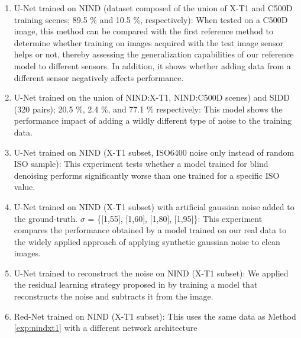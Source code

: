 \documentclass[10pt,twocolumn,letterpaper]{article}
\makeatletter
\newcommand\footnoteref[1]{\protected@xdef\@thefnmark{\ref{#1}}\@footnotemark}
\makeatother
\begin{document}
\begin{enumerate}
\itemsep0em 
\setcounter{enumi}{3}
  \item\label{exp:nindall}   U-Net trained on NIND (dataset composed of the union of X-T1 and C500D training scenes; 89.5 \% and 10.5 \%, respectively):\newline
  When tested on a C500D image, this method can be compared with the first reference method to determine whether training on images acquired with the test image sensor helps or not, thereby assessing the generalization capabilities of our reference model to different sensors.  In addition, it shows whether adding data from a different sensor negatively affects performance.
  \item\label{exp:nindsidd} U-Net trained on the union of NIND:X-T1, NIND:C500D scenes) and SIDD (320 pairs); 20.5 \%, 2.4 \%, and 77.1 \% respectively:\newline
  This model shows the performance impact of adding a wildly different type of noise to the training data.
  \item\label{exp:nind6400} U-Net trained on NIND (X-T1 subset, ISO6400 noise only instead of random ISO sample):\newline
  This experiment tests whether a model trained for blind denoising performs significantly worse than one trained for a specific ISO value.
  \item\label{exp:nindart} U-Net trained on NIND (X-T1 subset) with artificial gaussian noise added to the ground-truth. $\sigma$ = \{[1,55], [1,60], [1,80], [1,95]\}\footnoteref{sigmanote}:\newline
  This experiment compares the performance obtained by a model trained on our real data to the widely applied approach of applying synthetic gaussian noise to clean images.
  \item\label{exp:nindmakenoise} U-Net trained to reconstruct the noise on NIND (X-T1 subset):\newline
  We applied the residual learning strategy proposed in \cite{dncnn} by training a model that reconstructs the noise and subtracts it from the image.
  \item\label{exp:nindred} Red-Net \cite{rednet} trained on NIND (X-T1 subset):\newline
  This uses the same data as Method \ref{exp:nindxt1} with a different network architecture

\end{enumerate}
\end{document}
